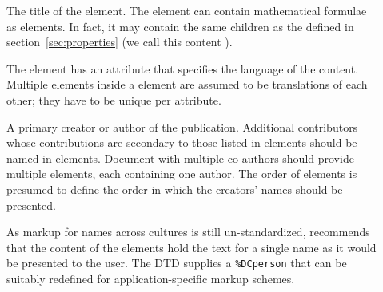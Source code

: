 \begin{description}
\item[{}] The title of the element. The {} element can
  contain mathematical formulae as {} elements. In fact, it may
  contain the same children as the {} defined in section~\ref{sec:properties} 
  (we call this content {}).

  The {} element has an
  {} attribute that specifies the language of the
  content. Multiple {} elements inside a {}
  element are assumed to be translations of each other; they have to be unique per
  {} attribute.
\item[{}] A primary creator or author of the publication.
  Additional contributors whose contributions are secondary to those listed in
  {} elements should be named in {}
  elements.  Document with multiple co-authors should provide multiple
  {} elements, each containing one author. The order of
  {} elements is presumed to define the order in which the
  creators' names should be presented.  
  
  As markup for names across cultures is still un-standardized, {\omdoc}
  recommends that the content of the {} elements hold the text
  for a single name as it would be presented to the user. The {\omdoc} DTD
  supplies a {}
  {\tt{\%DCperson}} that can be suitably redefined for application-specific markup
  schemes.
  

\end{description}
